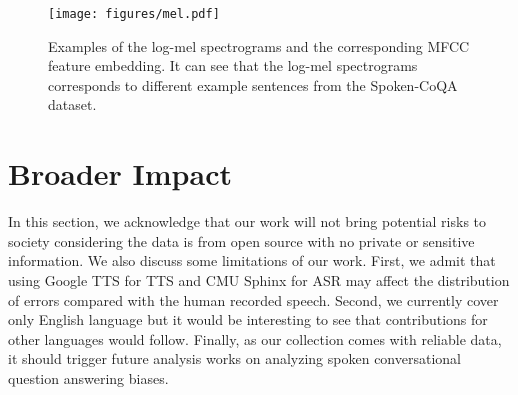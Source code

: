 \documentclass[11pt]{article}
\begin{document}
\begin{figure*}[h]
    \centering
    \texttt{[image: figures/mel.pdf]}
    \caption{Examples of the log-mel spectrograms and the corresponding MFCC feature embedding. It can see that the log-mel spectrograms corresponds to different example sentences from the Spoken-CoQA dataset.}
    \label{fig:mel}
\end{figure*}

\section{Broader Impact}
In this section, we acknowledge that our work will not bring potential risks to society considering the data is from open source with no private or sensitive information. We also discuss some limitations of our work. First, we admit that using Google TTS for TTS and CMU Sphinx for ASR may affect the distribution of errors compared with the human recorded speech. Second, we currently cover only English language but it would be interesting to see that contributions for other languages would follow. Finally, as our collection comes with reliable data, it should trigger future analysis works on analyzing spoken conversational question answering biases. 
 
\end{document}
